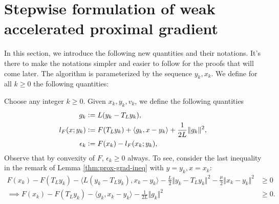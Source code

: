 \documentclass[12pt]{article}
\begin{document}
\section{Stepwise formulation of weak accelerated proximal gradient}
    In this section, we introduce the following new quantities and their notations. 
    It's there to make the notations simpler and easier to follow for the proofs that will come later. 
    The algorithm is parameterized by the sequence $y_k, x_k$. 
    We define for all $k \ge 0$ the following quantities: 
    \begin{assumption}
        Choose any integer $k\ge 0$. 
        Given $x_k, y_k, v_k$, we define the following quantities
        \begin{align}
            g_k &\vcentcolon= L(y_k - T_L y_k), 
            \label{eqn:grad-map}
            \\
            l_F(x; y_k) &\vcentcolon= F(T_Ly_k) + \langle g_k, x - y_k\rangle + \frac{1}{2L}\Vert g_k\Vert^2, 
            \label{eqn:lower-linearization}
            \\
            \epsilon_{k} &\vcentcolon= F(x_k) - l_F(x_k; y_k), 
            \label{eqn:regret}
        \end{align}
        Observe that by convexity of $F$, $\epsilon_k \ge 0$ always. 
        To see, consider the last inequality in the remark of Lemma \ref{thm:prox-grad-ineq} with $y = y_k, x = x_k$: 
        \begin{align*}
            F(x_k) - F(T_Ly_k)
            - \langle L(y_k - T_Ly_k),x_k - y_k \rangle
            - \frac{L}{2}\Vert y_k - T_Ly_k\Vert^2
            - \frac{\mu}{2}\Vert x_k - y_k\Vert^2
            &\ge 0
            \\
            \implies 
            F(x_k) - F(T_Ly_k)
            - \langle g_k,x_k - y_k \rangle
            - \frac{1}{2L}\Vert g_k\Vert^2
            &\ge 0. 
        \end{align*}
    \end{assumption}
    
\end{document}
